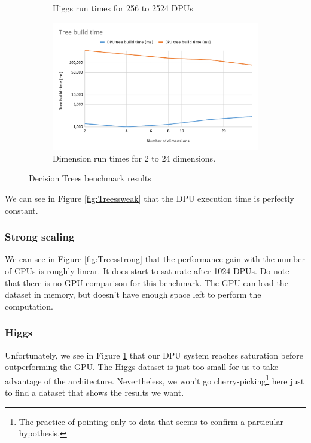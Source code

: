 \begin{figure}
\begin{subfigure}{0.48\linewidth}
        \caption{Higgs run times for 256 to 2524 DPUs}
        \label{fig:TreesHiggs}
    \end{subfigure}\hfill
    \begin{subfigure}{0.48\linewidth}
        \includegraphics[width=\linewidth]{figures/Treesdim.pdf}
        \caption{Dimension run times for 2 to 24 dimensions.}
        \label{fig:Treesdim}
    \end{subfigure}
    \caption{Decision Trees benchmark results}
\end{figure}


We can see in Figure \ref{fig:Treessweak} that the DPU execution time is perfectly constant.

\subsubsection{Strong scaling}

We can see in Figure \ref{fig:Treesstrong} that the performance gain with the number of CPUs is roughly linear. It does start to saturate after 1024 DPUs. Do note that there is no GPU comparison for this benchmark. The GPU can load the dataset in memory, but doesn't have enough space left to perform the computation.

\subsubsection{Higgs}

Unfortunately, we see in Figure \ref{fig:TreesHiggs} that our DPU system reaches saturation before outperforming the GPU. The Higgs dataset is just too small for us to take advantage of the architecture. Nevertheless, we won't go cherry-picking\footnote{The practice of pointing only to data that seems to confirm a particular hypothesis.} here just to find a dataset that shows the results we want. 

